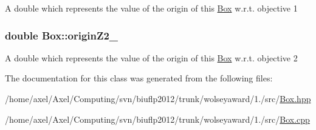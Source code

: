 \-A double which represents the value of the origin of this {\ttfamily \hyperlink{classBox}{\-Box}} w.\-r.\-t. objective 1 \hypertarget{classBox_a92db5d83336e00813c4131d52e12a1b9}{
\subsubsection[{origin\-Z2\-\_\-}]{\setlength{\rightskip}{0pt plus 5cm}double {\bf \-Box\-::origin\-Z2\-\_\-}}}\label{classBox_a92db5d83336e00813c4131d52e12a1b9}
\-A double which represents the value of the origin of this {\ttfamily \hyperlink{classBox}{\-Box}} w.\-r.\-t. objective 2 

\-The documentation for this class was generated from the following files\-:\begin{DoxyCompactItemize}
\item 
/home/axel/\-Axel/\-Computing/svn/biuflp2012/trunk/wolseyaward/1./src/\hyperlink{Box_8hpp}{\-Box.\-hpp}\item 
/home/axel/\-Axel/\-Computing/svn/biuflp2012/trunk/wolseyaward/1./src/\hyperlink{Box_8cpp}{\-Box.\-cpp}\end{DoxyCompactItemize}
